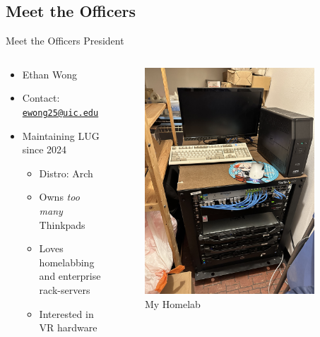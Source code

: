 \documentclass{beamer}
\begin{document}
\subsection{Meet the Officers}
\begin{frame}{Meet the Officers}
	{\Huge President}
	\begin{columns}
		\begin{column}{0.5\textwidth}
			\begin{itemize}
				\item {\Large Ethan Wong}
				\item Contact:
					\href{mailto:ewong25@uic.edu}{\texttt{ewong25@uic.edu}}
				\item Maintaining LUG since 2024
				\begin{itemize}
					\item Distro: Arch
					\item Owns \textit{too many} Thinkpads
					\item Loves homelabbing and enterprise rack-servers
					\item Interested in VR hardware
				\end{itemize}
			\end{itemize}
		\end{column}
		\begin{column}{0.5\textwidth}
			\begin{figure}
				\centering
				\includegraphics[width=0.9\textwidth,angle=270]{neko-homelab.jpg}
				\caption{My Homelab}
			\end{figure}
		\end{column}
	\end{columns}
\end{frame}
\end{document}
